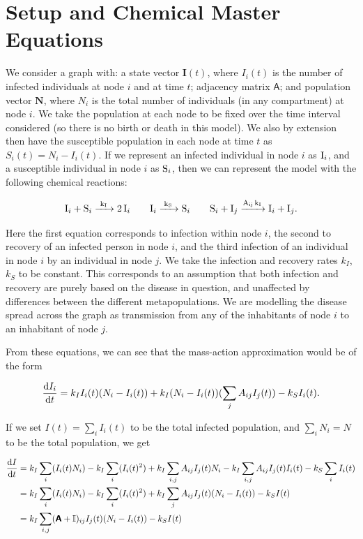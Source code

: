 \documentclass[12pt,a4paper,openany,twoside]{book}
\renewcommand{\v}[1]{\mathbf{#1}}      %
\newcommand{\m}[1]{\bm{\mathsf{#1}}}	 %
\renewcommand{\d}{{\mathrm d}}
\newcommand{\fd}[2]{\mathchoice{\frac{\d #1}{\d #2}}{\d #1/\d #2}{\d #1/\d #2}{\d #1/\d #2}}
\begin{document}
\section{Setup and Chemical Master Equations}

We consider a graph with: a state vector $\v{I}(t)$, where $I_i(t)$ is the number of infected individuals at node $i$ and at time $t$; adjacency matrix $\m{A}$; and population vector $\v{N}$, where $N_i$ is the total number of individuals (in any compartment) at node $i$. We take the population at each node to be fixed over the time interval considered (so there is no birth or death in this model). We also by extension then have the susceptible population in each node at time $t$ as $S_i(t) = N_i - I_i(t)$. If we represent an infected individual in node $i$ as $\ce{I_i}$, and a susceptible individual in node $i$ as $\ce{S_i}$, then we can represent the model with the following chemical reactions:

\begin{equation}
	\ce{I_i + S_i ->[k_I] 2 I_i} \qquad
	\ce{I_i ->[k_S] S_i} \qquad
	\ce{S_i + I_j ->[A_{ij} k_I] I_i + I_j}.
\end{equation}

Here the first equation corresponds to infection within node $i$, the second to recovery of an infected person in node $i$, and the third infection of an individual in node $i$ by an individual in node $j$. We take the infection and recovery rates $k_I$, $k_S$ to be constant. This corresponds to an assumption that both infection and recovery are purely based on the disease in question, and unaffected by differences between the different metapopulations. We are modelling the disease spread across the graph as transmission from any of the inhabitants of node $i$ to an inhabitant of node $j$.

From these equations, we can see that the mass-action approximation would be of the form

\begin{equation}
	\fd{I_i}{t} = k_I I_i(t) (N_i - I_i(t)) + k_I (N_i - I_i(t)) (\sum_j A_{ij} I_j(t)) - k_S I_i(t). \label{metaMA}
\end{equation}

If we set $I(t) = \sum_i I_i(t)$ to be the total infected population, and $\sum_i N_i = N$ to be the total population, we get

\begin{equation}
\begin{aligned}
	\fd {I} {t} &= k_I \sum_i (I_i(t) N_i) - k_I \sum_i (I_i(t)^2) + k_I \sum_{i, j} A_{ij} I_j(t) N_i - k_I \sum_{i, j} A_{ij} I_j(t) I_i(t) - k_S \sum_i I_i(t) \\
	&= k_I \sum_i (I_i(t) N_i) - k_I \sum_i (I_i(t)^2) + k_I \sum_{j} A_{ij} I_j(t) (N_i - I_i(t)) - k_S I(t) \\
	&= k_I \sum_{i,j} (\m A + \mathbb{I})_{ij} I_j(t) (N_i - I_i(t)) - k_S I(t)
\end{aligned}
\end{equation}
\end{document}

